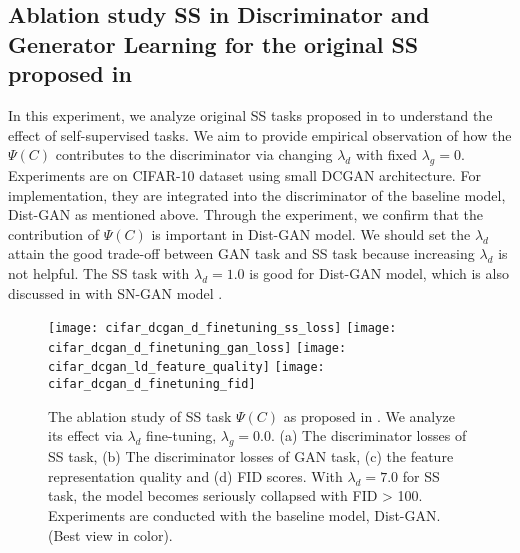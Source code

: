 \documentclass{article}
\begin{document}
\subsection{Ablation study SS in Discriminator and Generator Learning for the original SS proposed in 
\cite{chen-arxiv-2018}}



\label{appendix_ablation_discriminator_learning}

In this experiment, we analyze original SS tasks proposed in \cite{chen-arxiv-2018} to understand the effect of self-supervised tasks.
We aim to provide empirical observation of how the $\Psi(C)$ contributes to the discriminator via changing $\lambda_d$ with fixed $\lambda_g = 0$. Experiments are on CIFAR-10 dataset using small DCGAN architecture. For implementation, they are integrated into the discriminator of the baseline model, Dist-GAN \cite{tran-eccv-2018} as mentioned above. Through the experiment, we confirm that the contribution of $\Psi(C)$ is important in Dist-GAN model. We should set the $\lambda_d$ attain the good trade-off between GAN task and SS task because increasing $\lambda_d$ is not helpful. The SS task with $\lambda_d = 1.0$ is good for Dist-GAN model, which is also discussed in \cite{chen-arxiv-2018} with SN-GAN model \cite{miyato-iclr-2018}. 



\begin{figure}
  \centering
\texttt{[image: cifar\_dcgan\_d\_finetuning\_ss\_loss]}
  \texttt{[image: cifar\_dcgan\_d\_finetuning\_gan\_loss]}
\texttt{[image: cifar\_dcgan\_ld\_feature\_quality]}
  \texttt{[image: cifar\_dcgan\_d\_finetuning\_fid]}
  \caption{The ablation study of SS task $\Psi(C)$ as proposed in \cite{chen-arxiv-2018}. We analyze its effect via $\lambda_d$ fine-tuning, $\lambda_g = 0.0$. (a) The discriminator losses of SS task, (b) The discriminator losses of GAN task, (c) the feature representation quality and (d) FID scores. With $\lambda_d = 7.0$ for SS task, the model becomes seriously collapsed with FID > 100. Experiments are conducted with the baseline model, Dist-GAN. (Best view in color).}
  \label{ss_finetuning_dcgan}
\end{figure}
 
\end{document}
